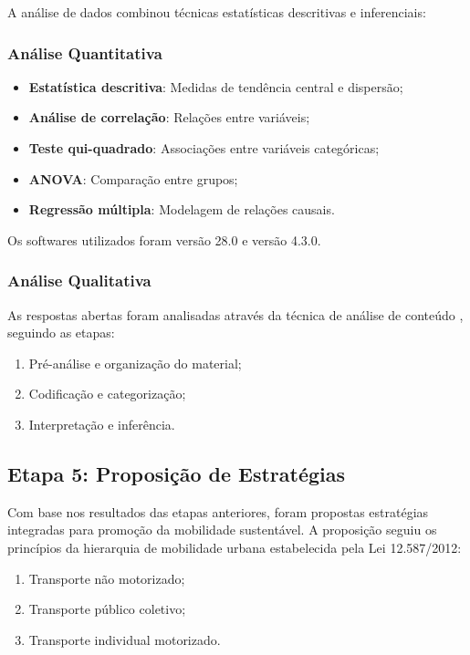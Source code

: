 A análise de dados combinou técnicas estatísticas descritivas e inferenciais:

\subsubsection{Análise Quantitativa}

\begin{itemize}
    \item \textbf{Estatística descritiva}: Medidas de tendência central e dispersão;
    \item \textbf{Análise de correlação}: Relações entre variáveis;
    \item \textbf{Teste qui-quadrado}: Associações entre variáveis categóricas;
    \item \textbf{ANOVA}: Comparação entre grupos;
    \item \textbf{Regressão múltipla}: Modelagem de relações causais.
\end{itemize}

Os softwares utilizados foram  versão 28.0 e  versão 4.3.0.

\subsubsection{Análise Qualitativa}

As respostas abertas foram analisadas através da técnica de análise de conteúdo \cite{bardin2016}, seguindo as etapas:
\begin{enumerate}
    \item Pré-análise e organização do material;
    \item Codificação e categorização;
    \item Interpretação e inferência.
\end{enumerate}

\subsection{Etapa 5: Proposição de Estratégias}

Com base nos resultados das etapas anteriores, foram propostas estratégias integradas para promoção da mobilidade sustentável. A proposição seguiu os princípios da hierarquia de mobilidade urbana estabelecida pela Lei 12.587/2012:

\begin{enumerate}
    \item Transporte não motorizado;
    \item Transporte público coletivo;
    \item Transporte individual motorizado.
\end{enumerate}

